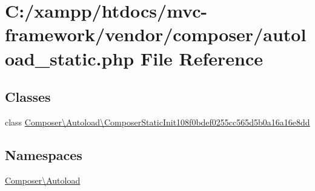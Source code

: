 \hypertarget{autoload__static_8php}{}\section{C\+:/xampp/htdocs/mvc-\/framework/vendor/composer/autoload\+\_\+static.php File Reference}
\label{autoload__static_8php}
\subsection*{Classes}
\begin{DoxyCompactItemize}
\item 
class \hyperlink{class_composer_1_1_autoload_1_1_composer_static_init108f0bdef0255cc565d5b0a16a16e8dd}{Composer\textbackslash{}\+Autoload\textbackslash{}\+Composer\+Static\+Init108f0bdef0255cc565d5b0a16a16e8dd}
\end{DoxyCompactItemize}
\subsection*{Namespaces}
\begin{DoxyCompactItemize}
\item 
 \hyperlink{namespace_composer_1_1_autoload}{Composer\textbackslash{}\+Autoload}
\end{DoxyCompactItemize}
